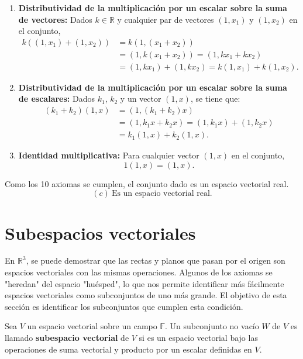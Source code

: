 \begin{example}
\begin{myproof}
\begin{enumerate}[$(a)$]
\begin{enumerate}[$1.$]
\item \textbf{Distributividad de la multiplicación por un escalar sobre la suma de vectores:} Dados $k\in \mathbb{R}$ y cualquier par de vectores $(1,x_1)$ y $(1,x_2)$ en el conjunto, 
\begin{align*}
k((1,x_1)+(1,x_2)) &= k(1,(x_1+x_2))\\
&=(1,k(x_1+x_2))=(1,kx_1+kx_2)\\
&=(1,kx_1)+(1,kx_2)=k(1,x_1)+k(1,x_2).
\end{align*}

\item \textbf{Distributividad de la multiplicación por un escalar sobre la suma de escalares:} Dados $k_1$, $k_2$ y un vector $(1,x)$, se tiene que: 
\begin{align*}
(k_1+k_2)(1,x) &= (1,(k_1+k_2)x)\\
&=(1,k_1x+k_2x)=(1,k_1x)+(1,k_2x)\\
&=k_1(1,x)+k_2(1,x).
\end{align*}

\item \textbf{Identidad multiplicativa:} Para cualquier vector $(1,x)$ en el conjunto, 
$$1(1,x) = (1,x).$$
\end{enumerate}
Como los 10 axiomas se cumplen, el conjunto dado es un espacio vectorial real.
$$\boxed{(c)\ \text{Es un espacio vectorial real.}}$$
\end{enumerate}

\end{myproof}
\end{example}
    


\section{Subespacios vectoriales}
En $\mathbb{R}^3$, se puede demostrar que las rectas y planos que pasan por el origen son espacios vectoriales con las mismas operaciones. Algunos de los axiomas se "heredan" del espacio "huésped", lo que nos permite identificar más fácilmente espacios vectoriales como subconjuntos de uno más grande. El objetivo de esta sección es identificar los subconjuntos que cumplen esta condición.

\begin{definition}\label{defsubespacio} Sea $V$ un espacio vectorial sobre un campo $\mathbb{F}.$ Un subconjunto no vacío $W$ de $V$ es llamado \textbf{subespacio vectorial} de $V$ si es un espacio vectorial bajo las operaciones de suma vectorial y producto por un escalar definidas en $V.$
\end{definition}

